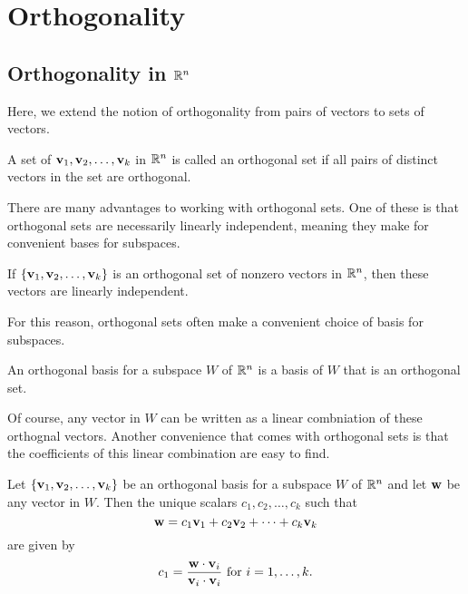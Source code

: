 \documentclass[../m73main.tex]{subfiles}
\begin{document}
\chapter{Orthogonality}

\section{Orthogonality in $\mathbb{R}^n$}
Here, we extend the notion of orthogonality from pairs of vectors to sets of vectors.

\begin{definition}
	A set of $\mathbf{v}_1, \mathbf{v}_2, \ldots, \mathbf{v}_k$ in $\mathbb{R}^n$ is called an orthogonal set if all pairs of distinct vectors in the set are orthogonal. 
\end{definition}

There are many advantages to working with orthogonal sets.
One of these is that orthogonal sets are necessarily linearly independent, meaning they make for convenient bases for subspaces.

\begin{theorem}
	If $\{\mathbf{v}_1, \mathbf{v}_2, \ldots, \mathbf{v}_k\}$ is an orthogonal set of nonzero vectors in $\mathbb{R}^n$, then these vectors are linearly independent.
\end{theorem}

For this reason, orthogonal sets often make a convenient choice of basis for subspaces.

\begin{definition}
	An orthogonal basis for a subspace $W$ of $\mathbb{R}^n$ is a basis of $W$ that is an orthogonal set.
\end{definition}

Of course, any vector in $W$ can be written as a linear combniation of these orthognal vectors.
Another convenience that comes with orthogonal sets is that the coefficients of this linear combination are easy to find.

\begin{theorem}
	Let $\{\mathbf{v}_1, \mathbf{v}_2, \ldots, \mathbf{v}_k\}$ be an orthogonal basis for a subspace $W$ of $\mathbb{R}^n$ and let $\mathbf{w}$ be any vector in $W$.
	Then the unique scalars $c_1, c_2, \ldots, c_k$ such that
	\[ \mathbf{w} = c_1 \mathbf{v}_1 + c_2 \mathbf{v}_2 + \cdots + c_k \mathbf{v}_k \]
	are given by
	\[ c_1 = \frac{\mathbf{w} \cdot \mathbf{v}_i}{\mathbf{v}_i \cdot \mathbf{v}_i} \text{ for } i = 1, \ldots, k. \]
\end{theorem}
\end{document}
